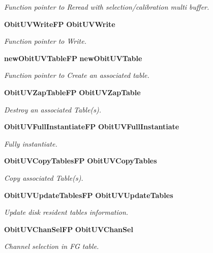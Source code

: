 \begin{CompactItemize}
\begin{CompactList}\small\item\em Function pointer to Reread with selection/calibration multi buffer. \item\end{CompactList}\item 
{\bf Obit\-UVWrite\-FP} {\bf Obit\-UVWrite}
\begin{CompactList}\small\item\em Function pointer to Write. \item\end{CompactList}\item 
{\bf new\-Obit\-UVTable\-FP} {\bf new\-Obit\-UVTable}
\begin{CompactList}\small\item\em Function pointer to Create an associated table. \item\end{CompactList}\item 
{\bf Obit\-UVZap\-Table\-FP} {\bf Obit\-UVZap\-Table}
\begin{CompactList}\small\item\em Destroy an associated Table(s). \item\end{CompactList}\item 
{\bf Obit\-UVFull\-Instantiate\-FP} {\bf Obit\-UVFull\-Instantiate}
\begin{CompactList}\small\item\em Fully instantiate. \item\end{CompactList}\item 
{\bf Obit\-UVCopy\-Tables\-FP} {\bf Obit\-UVCopy\-Tables}
\begin{CompactList}\small\item\em Copy associated Table(s). \item\end{CompactList}\item 
{\bf Obit\-UVUpdate\-Tables\-FP} {\bf Obit\-UVUpdate\-Tables}
\begin{CompactList}\small\item\em Update disk resident tables information. \item\end{CompactList}\item 
{\bf Obit\-UVChan\-Sel\-FP} {\bf Obit\-UVChan\-Sel}
\begin{CompactList}\small\item\em Channel selection in FG table. \item\end{CompactList}\end{CompactItemize}


